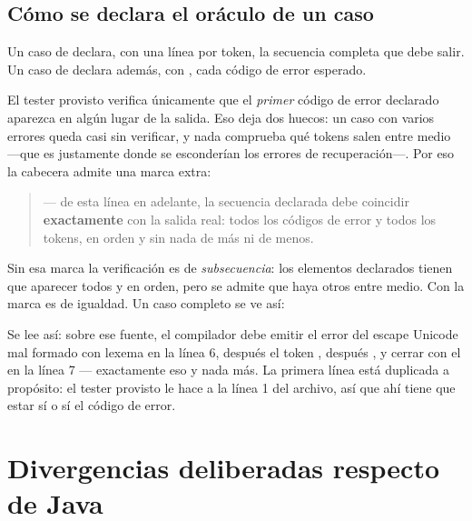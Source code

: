 \documentclass[11pt,a4paper]{article}
\begin{document}
\subsection{Cómo se declara el oráculo de un caso}

Un caso de  declara, con una línea  por token, la secuencia
completa que debe salir. Un caso de  declara además, con
, cada código de error esperado.

El tester provisto verifica únicamente que el \emph{primer} código de error declarado aparezca en
algún lugar de la salida. Eso deja dos huecos: un caso con varios errores queda casi sin verificar, y
nada comprueba qué tokens salen entre medio ---que es justamente donde se esconderían los errores de
recuperación---. Por eso la cabecera admite una marca extra:

\begin{quote}
\lex{// [Completo]} --- de esta línea en adelante, la secuencia declarada debe coincidir
\textbf{exactamente} con la salida real: todos los códigos de error y todos los tokens, en orden y
sin nada de más ni de menos.
\end{quote}

Sin esa marca la verificación es de \emph{subsecuencia}: los elementos declarados tienen que
aparecer todos y en orden, pero se admite que haya otros entre medio. Con la marca es de igualdad.
Un caso completo se ve así:


\noindent
Se lee así: sobre ese fuente, el compilador debe emitir el error del escape Unicode mal formado con
lexema  en la línea 6, después el token \lex{+}, después , y cerrar con el
 en la línea 7 --- exactamente eso y nada más. La primera línea está duplicada a propósito:
el tester provisto le hace  a la línea 1 del archivo, así que ahí tiene que estar
sí o sí el código de error.

\section{Divergencias deliberadas respecto de Java}
\label{sec:divergencias}
\end{document}
